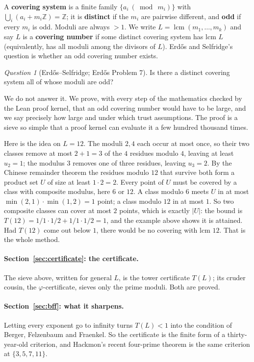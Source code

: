 \documentclass[11pt]{article}
\theoremstyle{definition}
\theoremstyle{remark}
\newtheorem{question}[theorem]{Question}
\newcommand{\Z}{\mathbb{Z}}
\newcommand{\lcm}{\operatorname{lcm}}
\begin{document}
A \textbf{covering system} is a finite family $\{a_i \ (\bmod\ m_i)\}$ with $\bigcup_i (a_i + m_i\Z) = \Z$; it is \textbf{distinct} if the $m_i$ are pairwise different, and \textbf{odd} if every $m_i$ is odd. Moduli are always $> 1$. We write $L = \lcm(m_1, \dots, m_k)$ and say $L$ is a \textbf{covering number} if some distinct covering system has lcm $L$ (equivalently, has all moduli among the divisors of $L$). Erd\H{o}s and Selfridge's question is whether an odd covering number exists.

\begin{question}[Erd\H{o}s--Selfridge; Erd\H{o}s Problem 7]
Is there a distinct covering system all of whose moduli are odd?
\end{question}

We do not answer it. We prove, with every step of the mathematics checked by the Lean proof kernel, that an odd covering number would have to be large, and we say precisely how large and under which trust assumptions. The proof is a sieve so simple that a proof kernel can evaluate it a few hundred thousand times.

Here is the idea on $L = 12$. The moduli $2, 4$ each occur at most once, so their two classes remove at most $2 + 1 = 3$ of the $4$ residues modulo $4$, leaving at least $u_2 = 1$; the modulus $3$ removes one of three residues, leaving $u_3 = 2$. By the Chinese remainder theorem the residues modulo $12$ that survive both form a product set $U$ of size at least $1 \cdot 2 = 2$. Every point of $U$ must be covered by a class with composite modulus, here $6$ or $12$. A class modulo $6$ meets $U$ in at most $\min(2, 1)\cdot\min(1, 2) = 1$ point; a class modulo $12$ in at most $1$. So two composite classes can cover at most $2$ points, which is exactly $|U|$: the bound is $T(12) = 1/1 \cdot 1/2 + 1/1 \cdot 1/2 = 1$, and the example above shows it is attained. Had $T(12)$ come out below $1$, there would be no covering with lcm $12$. That is the whole method.

\paragraph{Section~\ref{sec:certificate}: the certificate.} The sieve above, written for general $L$, is the tower certificate $T(L)$; its cruder cousin, the $\varphi$-certificate, sieves only the prime moduli. Both are proved.

\paragraph{Section~\ref{sec:bff}: what it sharpens.} Letting every exponent go to infinity turns $T(L) < 1$ into the condition of Berger, Felzenbaum and Fraenkel. So the certificate is the finite form of a thirty-year-old criterion, and Hackmon's recent four-prime theorem is the same criterion at $\{3,5,7,11\}$.
\end{document}
